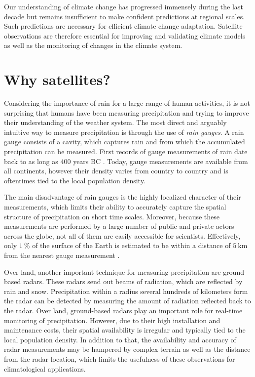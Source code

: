 Our understanding of climate change has progressed immensely during the last
decade but remains insufficient to make confident predictions at regional
scales. Such predictions are necessary for efficient climate change adaptation.
Satellite observations are therefore essential for improving and validating
climate models as well as the monitoring of changes in the climate system.


\section{Why satellites?}

Considering the importance of rain for a large range of human activities, it is
not surprising that humans have been measuring precipitation and trying to
improve their understanding of the weather system. The most direct and arguably
intuitive way to measure precipitation is through the use of \textit{rain
gauges}. A rain gauge consists of a cavity, which captures rain and from which
the accumulated precipitation can be measured. First records of gauge
measurements of rain date back to as long as 400 years
BC \citep{strangeways2000}. Today, gauge measurements are available from all
continents, however their density varies from country to country and is
oftentimes tied to the local population density.

The main disadvantage of rain gauges is the highly localized character of their
measurements, which limits their ability to accurately capture the spatial
structure of precipitation on short time scales. Moreover, because these
measurements are performed by a large number of public and private actors across
the globe, not all of them are easily accessible for scientists. Effectively,
only $\SI{1}{\percent}$ of the surface of the Earth is estimated to be within a
distance of $\SI{5}{\kilo \meter}$ from the nearest gauge
measurement \citep{kidd17}.

Over land, another important technique for measuring precipitation are
ground-based radars. These radars send out beams of radiation, which are
reflected by rain and snow. Precipitation within a radius several hundreds of
kilometers form the radar can be detected by measuring the amount of radiation
reflected back to the radar. Over land, ground-based radars play an important
role for real-time monitoring of precipitation. However, due to their high
installation and maintenance costs, their spatial availability is irregular and
typically tied to the local population density. In addition to that, the
availability and accuracy of radar measurements may be hampered by complex
terrain as well as the distance from the radar location, which limits the
usefulness of these observations for climatological applications.

